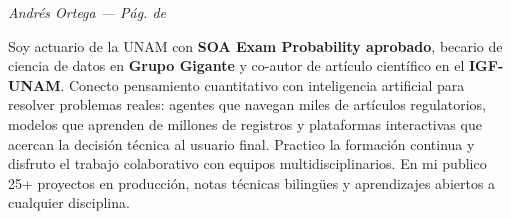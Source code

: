 \documentclass[10pt, letterpaper]{awesome-cv}
\renewcommand{\acvSectionContentTopSkip}{0.3mm}
\renewenvironment{cvparagraph}{%
  \vspace{\acvSectionContentTopSkip}%
  \vspace{-3mm}%
  \paragraphstyle%
}{%
  \par%
  \vspace{0.3mm}%
}
\renewcommand*{\paragraphstyle}{\fontsize{8.5pt}{1.15em}\bodyfontlight\upshape\color{text}}
\begin{document}
\makecvheader[C]


\makecvfooter
  {}
  {\color{lightgray}\textit{\small Andrés Ortega — Pág. \thepage{} de \pageref*{LastPage}}}
  {}


\begin{cvparagraph}
Soy actuario de la UNAM con \textbf{SOA Exam Probability aprobado}, becario de ciencia de datos en \textbf{Grupo Gigante} y co-autor de artículo científico en el \textbf{IGF-UNAM}. Conecto pensamiento cuantitativo con inteligencia artificial para resolver problemas reales: agentes que navegan miles de artículos regulatorios, modelos que aprenden de millones de registros y plataformas interactivas que acercan la decisión técnica al usuario final. Practico la formación continua y disfruto el trabajo colaborativo con equipos multidisciplinarios. En mi  publico 25+ proyectos en producción, notas técnicas bilingües y aprendizajes abiertos a cualquier disciplina.
\end{cvparagraph}

\end{document}
